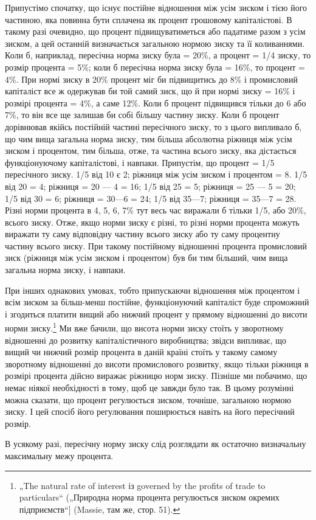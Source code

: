 Припустімо спочатку, що існує постійне відношення між усім
зиском і тією його частиною, яка повинна бути сплачена як процент
грошовому капіталістові. В такому разі очевидно, що процент
підвищуватиметься або падатиме разом з усім зиском, а цей
останній визначається загальною нормою зиску та її коливаннями.
Коли б, наприклад, пересічна норма зиску була = 20\%, а процент
= 1/4 зиску, то розмір процента = 5\%; коли б пересічна
норма зиску була = 16\%, то процент = 4\%. При нормі зиску в
20\% процент міг би підвищитись до 8\% і промисловий капіталіст
все ж одержував би той самий зиск, що й при нормі зиску
= 16\% і розмірі процента = 4\%, а саме 12\%. Коли б процент
підвищився тільки до 6 або 7\%, то він все ще залишав би собі
більшу частину зиску. Коли б процент дорівнював якійсь постійній
частині пересічного зиску, то з цього випливало б, що
чим вища загальна норма зиску, тим більша абсолютна ріжниця
між усім зиском і процентом, тим більша, отже, та частина
всього зиску, яка дістається функціонуючому капіталістові, і навпаки.
Припустім, що процент = 1/5 пересічного зиску. 1/5 від 10
є 2; ріжниця між усім зиском і процентом = 8. 1/5 від 20 = 4;
ріжниця = 20 — 4 = 16; 1/5 від 25 = 5; ріжниця = 25 — 5 = 20; 1/5 від
30 = 6; ріжниця = 30—6 = 24; 1/5 від 35—7; ріжниця = 35—7 = 28.
Різні норми процента в 4, 5, 6, 7\% тут весь час виражали б
тільки 1/5, або 20\%, всього зиску. Отже, якщо норми зиску є різні,
то різні норми процента можуть виражати ту саму відповідну
частину всього зиску або ту саму процентну частину всього
зиску. При такому постійному відношенні процента промисловий
зиск (ріжниця між усім зиском і процентом) був би тим більший,
чим вища загальна норма зиску, і навпаки.

При інших однакових умовах, тобто припускаючи відношення
між процентом і всім зиском за більш-менш постійне, функціонуючий
капіталіст буде спроможний і згодиться платити вищий
або нижчий процент у прямому відношенні до висоти норми
зиску.\footnote{
„The natural rate of interest із governed by the profits of trade to particulars“
(„Природна норма процента регулюється зиском окремих підприємств“]
(Massie, там же, стор. 51).
} Ми вже бачили, що висота норми зиску стоїть у зворотному
відношенні до розвитку капіталістичного виробництва;
звідси випливає, що вищий чи нижчий розмір процента в даній
країні стоїть у такому самому зворотному відношенні до висоти
промислового розвитку, якщо тільки ріжниця в розмірі
процента дійсно виражає ріжницю норм зиску. Пізніше ми побачимо,
що немає ніякої необхідності в тому, щоб це завжди
було так. В цьому розумінні можна сказати, що процент регулюється
зиском, точніше, загальною нормою зиску. І цей спосіб
його регулювання поширюється навіть на його пересічний розмір.

В усякому разі, пересічну норму зиску слід розглядати як
остаточно визначальну максимальну межу процента.